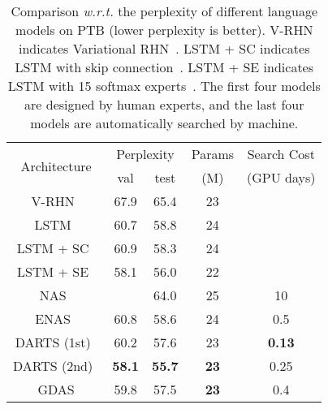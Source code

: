 \documentclass[10pt,twocolumn,letterpaper]{article}
\begin{document}
\begin{table}[t!]
\centering
\setlength{\tabcolsep}{4pt}
\begin{tabular}{| c | c | c | c | c |} \hline\hline

\multirow{2}{*}{Architecture}          & \multicolumn{2}{c|}{Perplexity} & Params & Search Cost \\\cline{2-3}
                                       &     val     &      test        & (M)    & (GPU days) \\\hline
V-RHN~\cite{zilly2017recurrent}        &   67.9      &   65.4           & 23     &         \\
LSTM~\cite{merity2018regularizing}     &   60.7      &   58.8           & 24     &         \\
LSTM + SC~\cite{merity2018regularizing}&   60.9      &   58.3           & 24     &          \\
LSTM + SE~\cite{yang2018breaking}      &   58.1      &   56.0           & 22     &          \\
\hline\hline
NAS~\cite{zoph2017NAS}                 &          &   64.0           & 25     & 10    \\
ENAS~\cite{pmlr-v80-pham18a}           &    60.8     &   58.6           & 24     & 0.5         \\
DARTS (1st)~\cite{liu2019darts}        &    60.2     &   57.6           & 23     & \textbf{0.13} \\
DARTS (2nd)~\cite{liu2019darts}        &\textbf{58.1}&\textbf{55.7}     &\textbf{23}&0.25 \\\hline
GDAS                                   &    59.8     &      57.5        &\textbf{23}&    0.4     \\\hline
\hline
\end{tabular}
\vspace{2mm}
\caption{
Comparison \textit{w.r.t.} the perplexity of different language models on PTB (lower perplexity is better).
V-RHN indicates Variational RHN~\cite{zilly2017recurrent}.
LSTM + SC indicates LSTM with skip connection~\cite{merity2018regularizing}.
LSTM + SE indicates LSTM with 15 softmax experts~\cite{yang2018breaking}.
The first four models are designed by human experts, and the last four models are automatically searched by machine.
}
\vspace{-2mm}
\label{table:PTB}
\end{table}
\end{document}
